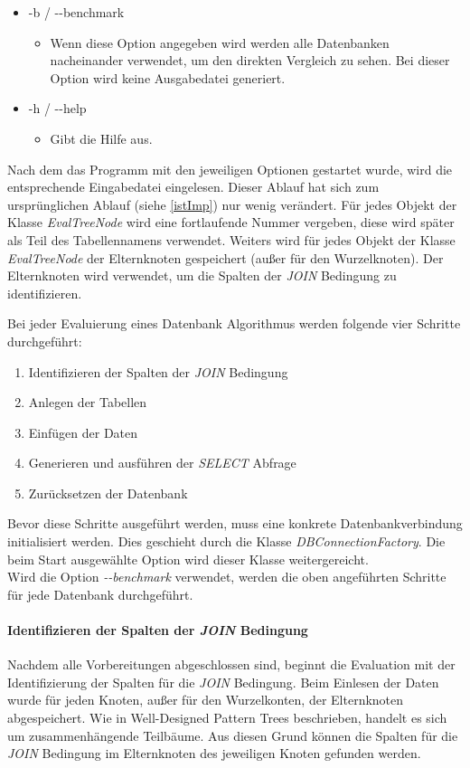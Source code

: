 \documentclass[draft,final]{vutinfth} %
\begin{document}
\begin{itemize}
\begin{itemize}
	\end{itemize} 
	\item -b / -{}-benchmark
	\begin{itemize}
		\item Wenn diese Option angegeben wird werden alle Datenbanken nacheinander verwendet, um den direkten Vergleich zu sehen. Bei dieser Option wird keine Ausgabedatei generiert.
	\end{itemize}  
	\item -h / -{}-help
	\begin{itemize}
		\item Gibt die Hilfe aus.
	\end{itemize} 
\end{itemize}

Nach dem das Programm mit den jeweiligen Optionen gestartet wurde, wird die entsprechende Eingabedatei eingelesen. Dieser Ablauf hat sich zum ursprünglichen Ablauf (siehe \ref{istImp}) nur wenig verändert. Für jedes Objekt der Klasse \textit{EvalTreeNode} wird eine fortlaufende Nummer vergeben, diese wird später als Teil des Tabellennamens verwendet. Weiters wird für jedes Objekt der Klasse \textit{EvalTreeNode} der Elternknoten gespeichert (au\ss er für den Wurzelknoten). Der Elternknoten wird verwendet, um die Spalten der \textit{JOIN} Bedingung zu identifizieren.

Bei jeder Evaluierung eines Datenbank Algorithmus werden folgende vier Schritte durchgeführt:

\begin{enumerate}
	\item Identifizieren der Spalten der \textit{JOIN} Bedingung
	\item Anlegen der Tabellen
	\item Einfügen der Daten
	\item Generieren und ausführen der \textit{SELECT} Abfrage
	\item Zurücksetzen der Datenbank
\end{enumerate}

Bevor diese Schritte ausgeführt werden, muss eine konkrete Datenbankverbindung initialisiert werden. Dies geschieht durch die Klasse \textit{DBConnectionFactory}. Die beim Start ausgewählte Option wird dieser Klasse weitergereicht. \\
Wird die Option \textit{-{}-benchmark} verwendet, werden die oben angeführten Schritte für jede Datenbank durchgeführt. 


\paragraph{Identifizieren der Spalten der \textit{JOIN} Bedingung} \label{joinCols}
Nachdem alle Vorbereitungen abgeschlossen sind, beginnt die Evaluation mit der Identifizierung der Spalten für die \textit{JOIN} Bedingung. Beim Einlesen der Daten wurde für jeden Knoten, au\ss er für den Wurzelkonten, der Elternknoten abgespeichert. Wie in Well-Designed Pattern Trees \cite[S.~172]{OptMat} beschrieben, handelt es sich um zusammenhängende Teilbäume. Aus diesen Grund können die Spalten für die \textit{JOIN} Bedingung im Elternknoten des jeweiligen Knoten gefunden werden. 
\end{document}
